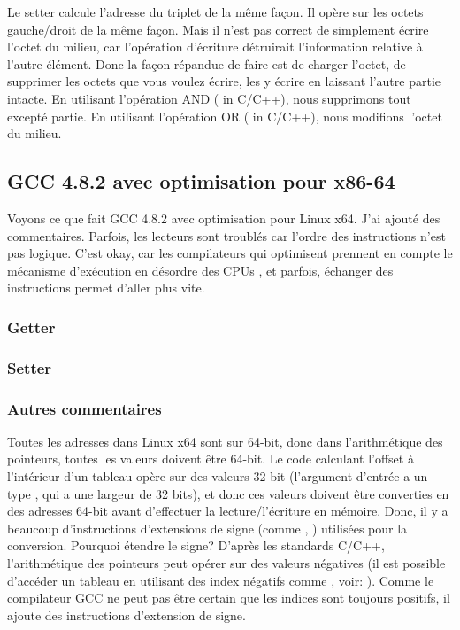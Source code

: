 Le setter calcule l'adresse du triplet de la même façon.
Il opère sur les octets gauche/droit de la même façon.
Mais il n'est pas correct de simplement écrire l'octet du milieu, car l'opération
d'écriture détruirait l'information relative à l'autre élément.
Donc la façon répandue de faire est de charger l'octet, de supprimer les octets que
vous voulez écrire, les y écrire en laissant l'autre partie intacte.
En utilisant l'opération AND (\TT{\&} in C/C++), nous supprimons tout excepté  partie.
En utilisant l'opération OR (\TT{|} in C/C++), nous modifions l'octet du milieu.

\subsection{GCC 4.8.2 avec optimisation pour x86-64}

Voyons ce que fait GCC 4.8.2 avec optimisation pour Linux x64.
J'ai ajouté des commentaires.
Parfois, les lecteurs sont troublés car l'ordre des instructions n'est pas logique.
C'est okay, car les compilateurs qui optimisent prennent en compte le mécanisme d'exécution
en désordre des CPUs , et parfois,  échanger des instructions permet d'aller plus vite.

\subsubsection{Getter}



\subsubsection{Setter}



\subsubsection{Autres commentaires}

Toutes les adresses dans Linux x64 sont sur 64-bit, donc dans l'arithmétique des
pointeurs, toutes les valeurs doivent être 64-bit.
Le code calculant l'offset à l'intérieur d'un  tableau opère sur des valeurs 32-bit
(l'argument d'entrée  a un type , qui a une largeur de 32 bits),
et donc ces valeurs doivent être converties en des adresses 64-bit avant d'effectuer
la lecture/l'écriture en mémoire.
Donc, il y a beaucoup d'instructions d'extensions de signe (comme , )
utilisées pour la conversion.
Pourquoi étendre le signe? D'après les standards C/C++, l'arithmétique des pointeurs
peut opérer sur des valeurs négatives (il est possible d'accéder un tableau en utilisant
des index négatifs comme , voir: ).
Comme le compilateur GCC ne peut pas être certain que les indices sont toujours positifs,
il ajoute des instructions d'extension de signe.

